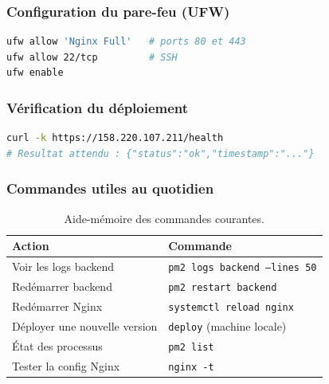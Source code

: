 \documentclass[11pt,a4paper,oneside]{report}
\newcommand{\thd}[1]{\textbf{\textcolor{AlanyaIndigoDark}{#1}}}
\begin{document}
\subsubsection{Configuration du pare-feu (UFW)}
\begin{lstlisting}[language=bash,caption={Ouverture des ports avec UFW},captionpos=b]
ufw allow 'Nginx Full'   # ports 80 et 443
ufw allow 22/tcp         # SSH
ufw enable
\end{lstlisting}

\subsubsection{V\'{e}rification du d\'{e}ploiement}
\begin{lstlisting}[language=bash,caption={Test de l'API en HTTPS},captionpos=b]
curl -k https://158.220.107.211/health
# Resultat attendu : {"status":"ok","timestamp":"..."}
\end{lstlisting}

\subsubsection{Commandes utiles au quotidien}
\begin{table}[H]
\centering\small
\begin{tabularx}{\linewidth}{@{}l X@{}}
\toprule
\thd{Action} & \thd{Commande}\\
\midrule
Voir les logs backend   & \texttt{pm2 logs backend --lines 50}\\
Red\'{e}marrer backend  & \texttt{pm2 restart backend}\\
Red\'{e}marrer Nginx    & \texttt{systemctl reload nginx}\\
D\'{e}ployer une nouvelle version & \texttt{deploy} (machine locale)\\
\'{E}tat des processus  & \texttt{pm2 list}\\
Tester la config Nginx  & \texttt{nginx -t}\\
\bottomrule
\end{tabularx}
\caption{Aide-m\'{e}moire des commandes courantes.}
\end{table}
\end{document}
